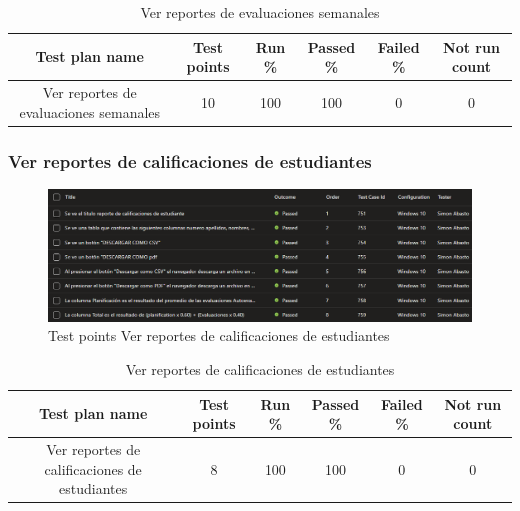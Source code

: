 \documentclass[12pt,letterpaper]{article}
\begin{document}
 \begin{table}[h] %
    \centering %
    \caption{Ver reportes de evaluaciones semanales} %
    \begin{tabular}{|c|c|c|c|c|c|}
        \rowcolor{green} %
        \hline
        Test plan name & Test points & Run \% & Passed \% & Failed \% & Not run count \\
        \hline
  Ver reportes de evaluaciones semanales& 10 & 100 & 100 & 0 & 0 \\
        \hline
    \end{tabular}
\end{table}


\subsubsection{Ver reportes de calificaciones de estudiantes}
\begin{figure}[H]
        \centering
        \includegraphics[width=1\linewidth]{Ver reportes de calificaciones de estudiantes.png}
        \caption{Test points Ver reportes de calificaciones de estudiantes}
    \end{figure}

 \begin{table}[h] %
    \centering %
    \caption{Ver reportes de calificaciones de estudiantes} %
    \begin{tabular}{|c|c|c|c|c|c|}
        \rowcolor{green} %
        \hline
        Test plan name & Test points & Run \% & Passed \% & Failed \% & Not run count \\
        \hline
   Ver reportes de calificaciones de estudiantes& 8 & 100 & 100 & 0 & 0 \\
        \hline
    \end{tabular}
\end{table}
\end{document}
